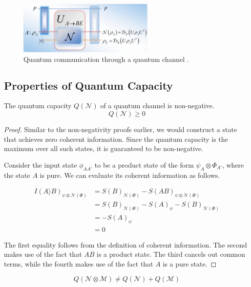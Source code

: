 \begin{figure}[H]
    \centering
    \includegraphics[width=0.6\textwidth]{figures/quantum_communication_quantum_channel.png}
    \caption{Quantum communication through a quantum channel \cite{Gyongyosi_2018}.}
\end{figure}

\subsection{Properties of Quantum Capacity}

\begin{theorem}
The quantum capacity $Q(\mathcal{N})$ of a quantum channel is non-negative.
$$Q(\mathcal{N}) \geq 0$$
\end{theorem}

\begin{proof}
Similar to the non-negativity proofs earlier, we would construct a state that achieves zero coherent information. Since the quantum capacity is the maximum over all such states, it is guaranteed to be non-negative.

Consider the input state $\phi_{AA'}$ to be a product state of the form $\psi_A \otimes \Phi_{A'}$, where the state $A$ is pure. We can evaluate its coherent information as follows.

\begin{align*}
I(A \rangle B)_{\psi \otimes \mathcal{N}(\Phi)} &= S(B)_{\mathcal{N}(\Phi)} - S(AB)_{\psi \otimes \mathcal{N}(\Phi)} \\
&= S(B)_{\mathcal{N}(\Phi)} - S(A)_{\psi} - S(B)_{\mathcal{N}(\Phi)} \\
&= - S(A)_{\psi} \\
&= 0
\end{align*}

The first equality follows from the definition of coherent information. The second makes use of the fact that $AB$ is a product state. The third cancels out common terms, while the fourth makes use of the fact that $A$ is a pure state.
\end{proof}

\begin{theorem}
$$Q(\mathcal{N} \otimes \mathcal{M}) \neq Q(\mathcal{N}) + Q(\mathcal{M})$$
\end{theorem}

